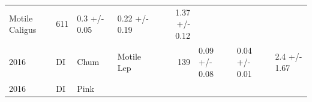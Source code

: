 \documentclass[fleqn,10pt]{wlpeerj} %
\begin{document}
\begin{longtable}[]{@{}llllrlll@{}}
\begin{minipage}[t]{0.11\columnwidth}
Motile Caligus\strut
\end{minipage} & \begin{minipage}[t]{0.04\columnwidth}\raggedleft\strut
611\strut
\end{minipage} & \begin{minipage}[t]{0.14\columnwidth}\raggedright\strut
0.3 +/- 0.05\strut
\end{minipage} & \begin{minipage}[t]{0.14\columnwidth}\raggedright\strut
0.22 +/- 0.19\strut
\end{minipage} & \begin{minipage}[t]{0.14\columnwidth}\raggedright\strut
1.37 +/- 0.12\strut
\end{minipage}\tabularnewline
\begin{minipage}[t]{0.09\columnwidth}\raggedright\strut
2016\strut
\end{minipage} & \begin{minipage}[t]{0.06\columnwidth}\raggedright\strut
DI\strut
\end{minipage} & \begin{minipage}[t]{0.06\columnwidth}\raggedright\strut
Chum\strut
\end{minipage} & \begin{minipage}[t]{0.11\columnwidth}\raggedright\strut
Motile Lep\strut
\end{minipage} & \begin{minipage}[t]{0.04\columnwidth}\raggedleft\strut
139\strut
\end{minipage} & \begin{minipage}[t]{0.14\columnwidth}\raggedright\strut
0.09 +/- 0.08\strut
\end{minipage} & \begin{minipage}[t]{0.14\columnwidth}\raggedright\strut
0.04 +/- 0.01\strut
\end{minipage} & \begin{minipage}[t]{0.14\columnwidth}\raggedright\strut
2.4 +/- 1.67\strut
\end{minipage}\tabularnewline
\begin{minipage}[t]{0.09\columnwidth}\raggedright\strut
2016\strut
\end{minipage} & \begin{minipage}[t]{0.06\columnwidth}\raggedright\strut
DI\strut
\end{minipage} & \begin{minipage}[t]{0.06\columnwidth}\raggedright\strut
Pink\strut
\end{minipage} & \begin{minipage}[t]{0.11\columnwidth}\raggedright\strut

\end{minipage}
\end{longtable}
\end{document}
